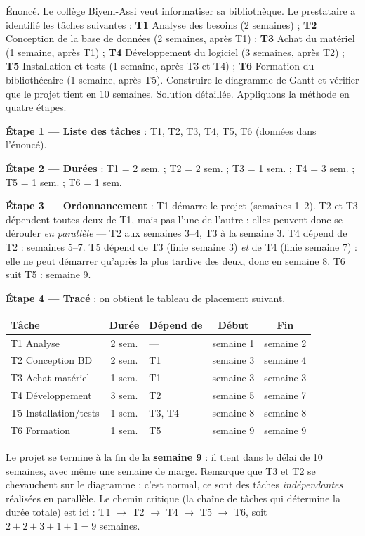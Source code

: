 \documentclass[11pt]{article}
\begin{document}
\begin{exoresolu}
Énoncé. Le collège Biyem-Assi veut informatiser sa bibliothèque. Le prestataire a identifié les tâches suivantes : \textbf{T1} Analyse des besoins (2 semaines) ; \textbf{T2} Conception de la base de données (2 semaines, après T1) ; \textbf{T3} Achat du matériel (1 semaine, après T1) ; \textbf{T4} Développement du logiciel (3 semaines, après T2) ; \textbf{T5} Installation et tests (1 semaine, après T3 et T4) ; \textbf{T6} Formation du bibliothécaire (1 semaine, après T5). Construire le diagramme de Gantt et vérifier que le projet tient en 10 semaines.
\tcblower
Solution détaillée. Appliquons la méthode en quatre étapes.

\textbf{Étape 1 — Liste des tâches} : T1, T2, T3, T4, T5, T6 (données dans l'énoncé).

\textbf{Étape 2 — Durées} : T1 = 2 sem. ; T2 = 2 sem. ; T3 = 1 sem. ; T4 = 3 sem. ; T5 = 1 sem. ; T6 = 1 sem.

\textbf{Étape 3 — Ordonnancement} : T1 démarre le projet (semaines 1--2). T2 et T3 dépendent toutes deux de T1, mais pas l'une de l'autre : elles peuvent donc se dérouler \emph{en parallèle} — T2 aux semaines 3--4, T3 à la semaine 3. T4 dépend de T2 : semaines 5--7. T5 dépend de T3 (finie semaine 3) \emph{et} de T4 (finie semaine 7) : elle ne peut démarrer qu'après la plus tardive des deux, donc en semaine 8. T6 suit T5 : semaine 9.

\textbf{Étape 4 — Tracé} : on obtient le tableau de placement suivant.

\begin{center}
\begin{tabularx}{\linewidth}{|l|c|X|c|c|}
\hline
\rowcolor{popblueL} \textbf{Tâche} & \textbf{Durée} & \textbf{Dépend de} & \textbf{Début} & \textbf{Fin} \\
\hline
T1 Analyse & 2 sem. & --- & semaine 1 & semaine 2 \\
\hline
T2 Conception BD & 2 sem. & T1 & semaine 3 & semaine 4 \\
\hline
T3 Achat matériel & 1 sem. & T1 & semaine 3 & semaine 3 \\
\hline
T4 Développement & 3 sem. & T2 & semaine 5 & semaine 7 \\
\hline
T5 Installation/tests & 1 sem. & T3, T4 & semaine 8 & semaine 8 \\
\hline
T6 Formation & 1 sem. & T5 & semaine 9 & semaine 9 \\
\hline
\end{tabularx}
\end{center}

Le projet se termine à la fin de la \textbf{semaine 9} : il tient dans le délai de 10 semaines, avec même une semaine de marge. Remarque que T3 et T2 se chevauchent sur le diagramme : c'est normal, ce sont des tâches \emph{indépendantes} réalisées en parallèle. Le chemin critique (la chaîne de tâches qui détermine la durée totale) est ici : T1 $\rightarrow$ T2 $\rightarrow$ T4 $\rightarrow$ T5 $\rightarrow$ T6, soit $2 + 2 + 3 + 1 + 1 = 9$ semaines.
\end{exoresolu}
\end{document}
